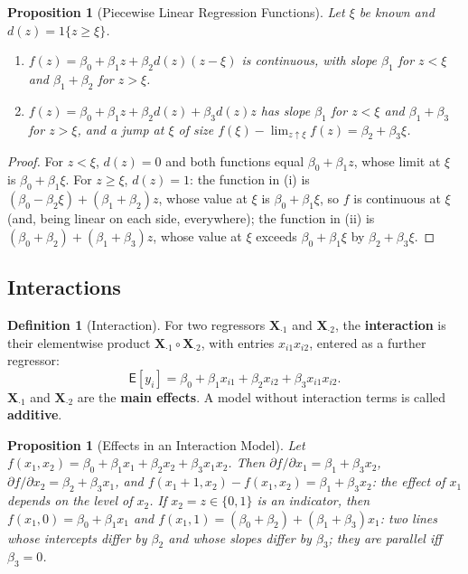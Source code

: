 \documentclass[14pt]{extarticle}
\theoremstyle{plain}
\newtheorem{proposition}[theorem]{Proposition}
\theoremstyle{definition}
\newtheorem{definition}[theorem]{Definition}
\theoremstyle{remark}
\newcommand\expc{\mathsf{E}}
\newcommand{\bX}{\mathbf{X}}
\begin{document}
\begin{proposition}[Piecewise Linear Regression Functions]\label{prop:piecewise}
Let $\xi$ be known and $d(z) = 1\{z \geqslant \xi\}$.
\begin{enumerate}[label=\textup{(\roman*)}]
\item $f(z) = \beta_0 + \beta_1z + \beta_2d(z)(z - \xi)$ is continuous, with slope $\beta_1$ for $z < \xi$ and $\beta_1 + \beta_2$ for $z > \xi$.
\item $f(z) = \beta_0 + \beta_1z + \beta_2d(z) + \beta_3d(z)z$ has slope $\beta_1$ for $z < \xi$ and $\beta_1 + \beta_3$ for $z > \xi$, and a jump at $\xi$ of size $f(\xi) - \lim_{z \uparrow \xi}f(z) = \beta_2 + \beta_3\xi$.
\end{enumerate}
\end{proposition}

\begin{proof}
For $z < \xi$, $d(z) = 0$ and both functions equal $\beta_0 + \beta_1z$, whose limit at $\xi$ is $\beta_0 + \beta_1\xi$. For $z \geqslant \xi$, $d(z) = 1$: the function in (i) is $(\beta_0 - \beta_2\xi) + (\beta_1 + \beta_2)z$, whose value at $\xi$ is $\beta_0 + \beta_1\xi$, so $f$ is continuous at $\xi$ (and, being linear on each side, everywhere); the function in (ii) is $(\beta_0 + \beta_2) + (\beta_1 + \beta_3)z$, whose value at $\xi$ exceeds $\beta_0 + \beta_1\xi$ by $\beta_2 + \beta_3\xi$.
\end{proof}

\subsection{Interactions}

\begin{definition}[Interaction]\label{def:interaction}
For two regressors $\bX_{\cdot 1}$ and $\bX_{\cdot 2}$, the \textbf{interaction} is their elementwise product $\bX_{\cdot 1} \circ \bX_{\cdot 2}$, with entries $x_{i1}x_{i2}$, entered as a further regressor:
\[
\expc[y_i] = \beta_0 + \beta_1x_{i1} + \beta_2x_{i2} + \beta_3x_{i1}x_{i2}.
\]
$\bX_{\cdot 1}$ and $\bX_{\cdot 2}$ are the \textbf{main effects}. A model without interaction terms is called \textbf{additive}.
\end{definition}

\begin{proposition}[Effects in an Interaction Model]\label{prop:interaction}
Let $f(x_1, x_2) = \beta_0 + \beta_1x_1 + \beta_2x_2 + \beta_3x_1x_2$. Then $\partial f/\partial x_1 = \beta_1 + \beta_3x_2$, $\partial f/\partial x_2 = \beta_2 + \beta_3x_1$, and $f(x_1 + 1, x_2) - f(x_1, x_2) = \beta_1 + \beta_3x_2$: the effect of $x_1$ depends on the level of $x_2$. If $x_2 = z \in \{0, 1\}$ is an indicator, then $f(x_1, 0) = \beta_0 + \beta_1x_1$ and $f(x_1, 1) = (\beta_0 + \beta_2) + (\beta_1 + \beta_3)x_1$: two lines whose intercepts differ by $\beta_2$ and whose slopes differ by $\beta_3$; they are parallel iff $\beta_3 = 0$.
\end{proposition}
\end{document}
